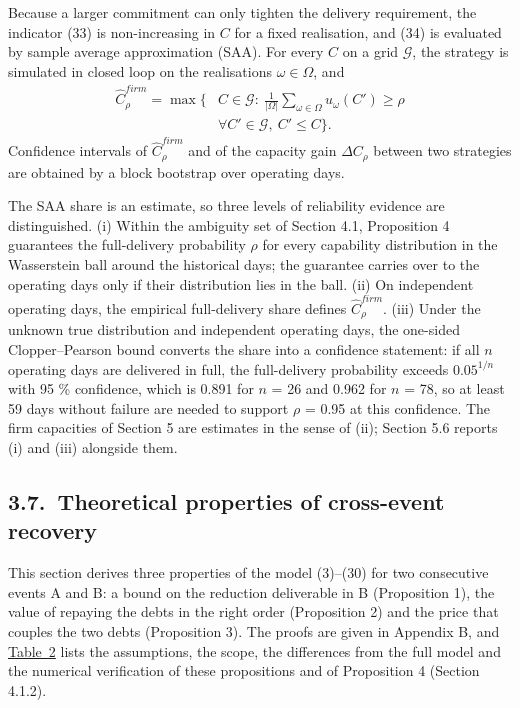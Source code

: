 \documentclass[a4paper,twocolumn,fleqn,10pt]{article}
\begin{document}
Because a larger commitment can only tighten the delivery requirement, the indicator (33) is non-increasing in \(C\) for a fixed realisation, and (34) is evaluated by sample average approximation (SAA). For every \(C\) on a grid \(\mathcal G\), the strategy is simulated in closed loop on the realisations \(\omega\in\Omega\), and \[\begin{aligned}\hat C^{firm}_\rho=\max\Big\{&C\in\mathcal G:\ \frac{1}{|\Omega|}\sum_{\omega\in\Omega}u_\omega(C')\ge\rho\\&\forall C'\in\mathcal G,\ C'\le C\Big\}.\end{aligned} \tag{36}\] Confidence intervals of \(\hat C^{firm}_\rho\) and of the capacity gain \(\Delta C_\rho\) between two strategies are obtained by a block bootstrap over operating days.

The SAA share is an estimate, so three levels of reliability evidence are distinguished. (i) Within the ambiguity set of Section 4.1, Proposition 4 guarantees the full-delivery probability \(\rho\) for every capability distribution in the Wasserstein ball around the historical days; the guarantee carries over to the operating days only if their distribution lies in the ball. (ii) On independent operating days, the empirical full-delivery share defines \(\hat C^{firm}_\rho\). (iii) Under the unknown true distribution and independent operating days, the one-sided Clopper--Pearson bound converts the share into a confidence statement: if all \(n\) operating days are delivered in full, the full-delivery probability exceeds \(0.05^{1/n}\) with 95 \% confidence, which is 0.891 for \(n\) = 26 and 0.962 for \(n\) = 78, so at least 59 days without failure are needed to support \(\rho\) = 0.95 at this confidence. The firm capacities of Section 5 are estimates in the sense of (ii); Section 5.6 reports (i) and (iii) alongside them.

\subsection*{3.7.~Theoretical properties of cross-event recovery}

This section derives three properties of the model (3)--(30) for two consecutive events A and B: a bound on the reduction deliverable in B (Proposition 1), the value of repaying the debts in the right order (Proposition 2) and the price that couples the two debts (Proposition 3). The proofs are given in Appendix B, and \hyperref[tab2]{Table~2} lists the assumptions, the scope, the differences from the full model and the numerical verification of these propositions and of Proposition 4 (Section 4.1.2).
\end{document}
